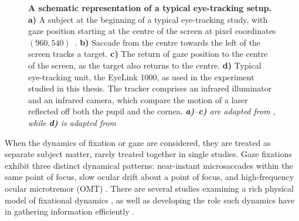 \begin{figure}[b!]
	\centering
	\begin{subfigure}[T]{0.2\textwidth}
		\centering
		
	\end{subfigure}
	\hfill
	\begin{subfigure}[T]{0.2\textwidth}
		\centering
		
	\end{subfigure}
    \hfill
	\begin{subfigure}[T]{0.2\textwidth}
		\centering
		
	\end{subfigure}
    \hfill
    \begin{subfigure}[T]{0.3\textwidth}
		\centering
		
	\end{subfigure}
	\caption{\textbf{A schematic representation of a typical eye-tracking setup.} \textbf{a)} A subject at the beginning of a typical eye-tracking study, with gaze position starting at the centre of the screen at pixel coordinates $(960, 540)$~\unit{\px}. \textbf{b)} Saccade from the centre towards the left of the screen tracks a target. \textbf{c)} The return of gaze position to the centre of the screen, as the target also returns to the centre. \textbf{d)} Typical eye-tracking unit, the EyeLink 1000, as used in the experiment studied in this thesis. The tracker comprises an infrared illuminator and an infrared camera, which compare the motion of a laser reflected off both the pupil and the cornea. \textit{\textbf{a)}--\textbf{c)} are adapted from \cite{srresearch2020eyelink3}, while \textbf{d)} is adapted from \cite{srresearch2013eyelink1000plus}}}
	\label{fig:eye-tracking}
\end{figure}

When the dynamics of fixation or gaze are considered, they are treated as separate subject matter, rarely treated together in single studies. Gaze fixations exhibit three distinct dynamical patterns: near-instant microsaccades within the same point of focus, slow ocular drift about a point of focus, and high-frequency ocular microtremor (OMT) \cite{van_ede_looking_2026,graham_ocular_2023, engbert_integrated_2011, spauschus_origin_1999}. There are several studies examining a rich physical model of fixational dynamics \cite{engbert_integrated_2011, engbert_normal, vasudevan_stochastic_nodate}, as well as developing the role such dynamics have in gathering information efficiently \cite{rucci_control_2015, rucci_miniature_2007, rucci_temporal_2018, rucci_unsteady_2015, roberts_fixational_2013, wu_fixational_2024}.

